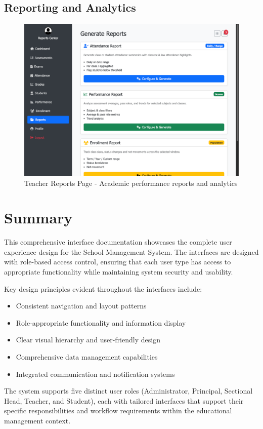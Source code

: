 \documentclass[12pt,a4paper]{article}
\begin{document}
\subsection{Reporting and Analytics}
\begin{figure}[H]
    \centering
    \includegraphics[width=\textwidth]{teacher/teacher-reports-page.png}
    \caption{Teacher Reports Page - Academic performance reports and analytics}
    \label{fig:teacher-reports}
\end{figure}

\section{Summary}

This comprehensive interface documentation showcases the complete user experience design for the School Management System. The interfaces are designed with role-based access control, ensuring that each user type has access to appropriate functionality while maintaining system security and usability.

Key design principles evident throughout the interfaces include:
\begin{itemize}
    \item Consistent navigation and layout patterns
    \item Role-appropriate functionality and information display
    \item Clear visual hierarchy and user-friendly design
    \item Comprehensive data management capabilities
    \item Integrated communication and notification systems
\end{itemize}

The system supports five distinct user roles (Administrator, Principal, Sectional Head, Teacher, and Student), each with tailored interfaces that support their specific responsibilities and workflow requirements within the educational management context.
\end{document}
